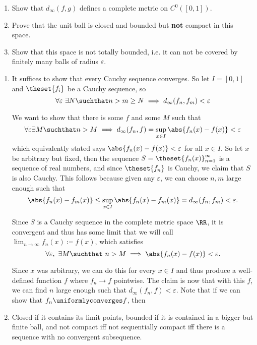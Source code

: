 \begin{problem}
\begin{enumerate}
  \item Show that $d_\infty(f, g)$ defines a complete metric on $C^0([0, 1])$.
  \item Prove that the unit ball is closed and bounded but \textbf{not} compact in this space.
  \item Show that this space is not totally bounded, i.e. it can not be covered by finitely many balls of radius $\varepsilon$.
\end{enumerate}
\end{problem}

\begin{solution}
\begin{enumerate}
  \item It suffices to show that every Cauchy sequence converges. So let $I = [0,1]$ and $\theset{f_i}$ be a Cauchy sequence, so
  $$
  \forall\varepsilon ~\exists N \suchthat n > m \geq N \implies d_\infty(f_n, f_m) < \varepsilon
  $$

  We want to show that there is some $f$ and some $M$ such that
  $$
  \forall\varepsilon \exists M \suchthat n > M \implies d_\infty(f_n, f)  = \sup_{x\in I} \abs{f_n(x) - f(x)} < \varepsilon
  $$
  which equivalently stated says $\abs{f_n(x) - f(x)} < \varepsilon$ for all $x\in I$. So let $x$ be arbitrary but fixed, then the sequence $S = \theset{f_n(x)}_{n=1}^\infty$ is a sequence of real numbers, and since $\theset{f_n}$ is Cauchy, we claim that $S$ is also Cauchy. This follows because given any $\varepsilon$, we can choose $n,m$ large enough such that
  $$
  \abs{f_n(x) - f_m(x)} \leq \sup_{x\in I} \abs{f_n(x) - f_m(x)} = d_\infty(f_n, f_m) < \varepsilon.
  $$


  Since $S$ is a Cauchy sequence in the complete metric space $\RR$, it is convergent and thus has some limit that we will call $\lim_{n\to\infty} f_n(x) \coloneqq f(x)$, which satisfies
  $$
  \forall \varepsilon,~ \exists M \suchthat ~n > M \implies \abs{f_n(x) - f(x)} < \varepsilon.
  $$

  Since $x$ was arbitrary, we can do this for every $x\in I$ and thus produce a well-defined function $f$ where $f_n \to f$ pointwise. The claim is now that with this $f$, we can find $n$ large enough such that $d_\infty(f_n, f)< \varepsilon$. Note that if we can show that $f_n \uniformlyconverges f$, then

  \item Closed if it contains its limit points, bounded if it is contained in a bigger but finite ball, and not compact iff not sequentially compact iff there is a sequence with no convergent subsequence.
\end{enumerate}
\end{solution}


